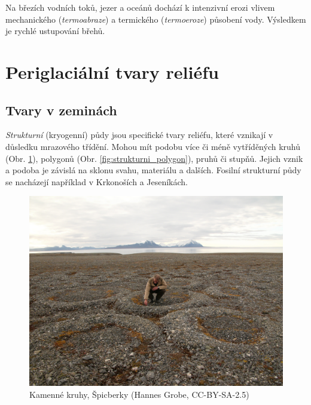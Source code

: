 Na březích vodních toků, jezer a oceánů dochází k intenzivní erozi vlivem mechanického (\emph{termoabraze}) a termického (\emph{termoeroze}) působení vody. Výsledkem je rychlé ustupování břehů. 


\section{Periglaciální tvary reliéfu}
\subsection{Tvary v zeminách}
\emph{Strukturní} (kryogenní) půdy jsou specifické tvary reliéfu, které vznikají v důsledku mrazového třídění. Mohou mít podobu více či méně vytříděných kruhů (Obr. \ref{fig:strukturni_kruh}), polygonů (Obr. \ref{fig:strukturni_polygon}), pruhů či stupňů. Jejich vznik a podoba je závislá na sklonu svahu, materiálu a dalších. Fosilní strukturní půdy se nacházejí například v Krkonoších a Jeseníkách.

\begin{figure}
	\centering
	\includegraphics[width=1\linewidth]{obrazky/periglac/polygony}
	\caption{Kamenné kruhy, Špicberky (Hannes Grobe, CC-BY-SA-2.5)}
	\label{fig:strukturni_kruh}
\end{figure}

